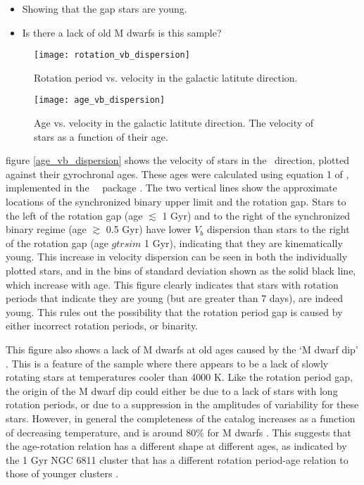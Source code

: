 \begin{itemize}
\item{Showing that the gap stars are young.}
\item{Is there a lack of old M dwarfs is this sample?}
\end{itemize}

\begin{figure}
  \caption{
Rotation period vs. velocity in the galactic latitute direction.
}
  \centering
    \texttt{[image: rotation\_vb\_dispersion]}
\label{fig:rotation_vb_dispersion}
\end{figure}

\begin{figure}
  \caption{
Age vs. velocity in the galactic latitute direction.
The velocity of stars as a function of their age.
}
  \centering
    \texttt{[image: age\_vb\_dispersion]}
\label{fig:age_vb_dispersion}
\end{figure}
figure \ref{age_vb_dispersion} shows the velocity of stars in the \bvector\
direction, plotted against their gyrochronal ages.
These ages were calculated using equation 1 of \citet{stardate_paper},
implemented in the \sd\ \python\ package \citep{stardate}.
The two vertical lines show the approximate locations of the synchronized
binary upper limit and the rotation gap.
Stars to the left of the rotation gap (age $\lesssim$ 1 Gyr) and to the right
of the synchronized binary regime (age $\gtrsim$ 0.5 Gyr) have lower $V_b$
dispersion than stars to the right of the rotation gap (age $gtrsim$ 1 Gyr),
indicating that they are kinematically young.
This increase in velocity dispersion can be seen in both the individually
plotted stars, and in the bins of standard deviation shown as the solid black
line, which increase with age.
This figure clearly indicates that stars with rotation periods that indicate
they are young (but are greater than 7 days), are indeed young.
This rules out the possibility that the rotation period gap is caused by
either incorrect rotation periods, or binarity.

This figure also shows a lack of M dwarfs at old ages caused by the `M dwarf
dip' \citep{vansaders2019, mcquillan2014}.
This is a feature of the \citet{mcquillan2014} sample where there appears to
be a lack of slowly rotating stars at temperatures cooler than 4000 K.
Like the rotation period gap, the origin of the M dwarf dip could either be
due to a lack of stars with long rotation periods, or due to a suppression in
the amplitudes of variability for these stars.
However, in general the completeness of the \citet{mcquillan2014} catalog
increases as a function of decreasing temperature, and is around 80\% for M
dwarfs \citep{mcquillan2013, mcquillan2014, simonian2019}.
This suggests that the age-rotation relation has a different shape at
different ages, as indicated by the 1 Gyr NGC 6811 cluster that has a
different rotation period-age relation to those of younger clusters
\citep{curtis2019}.

